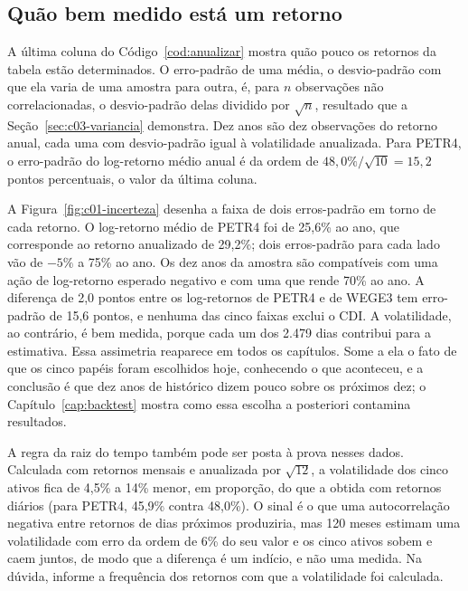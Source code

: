 \subsection{Quão bem medido está um retorno}
\label{sec:c01-incerteza}

A última coluna do Código~\ref{cod:anualizar} mostra quão pouco os retornos da tabela estão determinados. O erro-padrão de uma média, o desvio-padrão com que ela varia de uma amostra para outra, é, para $n$ observações não correlacionadas, o desvio-padrão delas dividido por $\sqrt{n}$, resultado que a Seção~\ref{sec:c03-variancia} demonstra. Dez anos são dez observações do retorno anual, cada uma com desvio-padrão igual à volatilidade anualizada. Para PETR4, o erro-padrão do log-retorno médio anual é da ordem de $48,0\%/\sqrt{10} = 15,2$ pontos percentuais, o valor da última coluna.


A Figura~\ref{fig:c01-incerteza} desenha a faixa de dois erros-padrão em torno de cada retorno. O log-retorno médio de PETR4 foi de 25,6\% ao ano, que corresponde ao retorno anualizado de 29,2\%; dois erros-padrão para cada lado vão de $-5\%$ a 75\% ao ano. Os dez anos da amostra são compatíveis com uma ação de log-retorno esperado negativo e com uma que rende 70\% ao ano. A diferença de 2,0 pontos entre os log-retornos de PETR4 e de WEGE3 tem erro-padrão de 15,6 pontos, e nenhuma das cinco faixas exclui o CDI. A volatilidade, ao contrário, é bem medida, porque cada um dos 2.479 dias contribui para a estimativa. Essa assimetria reaparece em todos os capítulos. Some a ela o fato de que os cinco papéis foram escolhidos hoje, conhecendo o que aconteceu, e a conclusão é que dez anos de histórico dizem pouco sobre os próximos dez; o Capítulo~\ref{cap:backtest} mostra como essa escolha a posteriori contamina resultados.

A regra da raiz do tempo também pode ser posta à prova nesses dados. Calculada com retornos mensais e anualizada por $\sqrt{12}$, a volatilidade dos cinco ativos fica de 4,5\% a 14\% menor, em proporção, do que a obtida com retornos diários (para PETR4, 45,9\% contra 48,0\%). O sinal é o que uma autocorrelação negativa entre retornos de dias próximos produziria, mas 120 meses estimam uma volatilidade com erro da ordem de 6\% do seu valor e os cinco ativos sobem e caem juntos, de modo que a diferença é um indício, e não uma medida. Na dúvida, informe a frequência dos retornos com que a volatilidade foi calculada.

